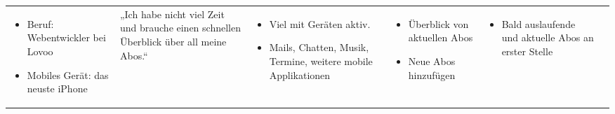 \documentclass{scrartcl}
\begin{document}
{\begin{tabular}{p{2cm}|p{5cm}|p{4cm}|p{5cm}|p{5cm}|p{4cm}}
\begin{itemize}[leftmargin=*]
\item Beruf: Webentwickler bei Lovoo
\item Mobiles Gerät: das neuste iPhone
\end{itemize} &
\vspace*{2em}
„Ich habe nicht viel Zeit und brauche einen schnellen Überblick über all meine Abos.“ &
\begin{itemize}[leftmargin=*]
\item Viel mit Geräten aktiv.
\item Mails, Chatten, Musik, Termine, weitere mobile Applikationen
\end{itemize} &
\begin{itemize}[leftmargin=*]
\item Überblick von aktuellen Abos
\item Neue Abos hinzufügen
\end{itemize} &
\begin{itemize}[leftmargin=*]
\item Bald auslaufende und aktuelle Abos an erster Stelle
\end{itemize}
\end{tabular}
}
\end{document}
